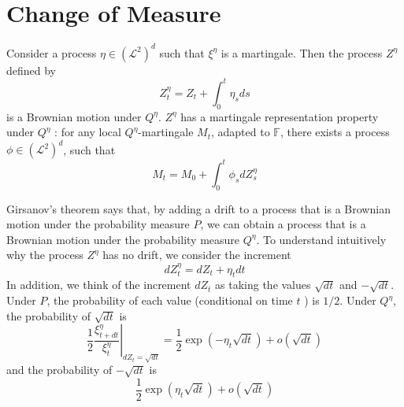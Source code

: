 \documentclass[\topdir/lecture\_notes.tex]{subfiles}
\begin{document}

\section{Change of Measure}
\begin{theorem}\label{thm: thm_273} 
Consider a process \(\eta \in\left(\mathcal{L}^{2}\right)^{d}\) such that \(\xi^{\eta}\) is a martingale. Then the process \(Z^{\eta}\) defined by
\begin{equation}
Z_{t}^{\eta}=Z_{t}+\int_{0}^{t} \eta_{s} d s \label{2.7.3}
\end{equation}
is a Brownian motion under \(Q^{\eta}\).
\(Z^{\eta}\) has a martingale representation property under \(Q^{\eta}\) : for any local \(Q^{\eta}\)-martingale \(M_{t}\), adapted to \(\mathbb{F}\), there exists a process \(\phi \in\left(\mathcal{L}^{2}\right)^{d}\), such that
\begin{equation*}
M_{t}=M_{0}+\int_{0}^{t} \phi_{s} d Z_{s}^{\eta}
\end{equation*}
\end{theorem}
Girsanov's theorem says that, by adding a drift to a process that is a Brownian motion under the probability measure \(P\), we can obtain a process that is a Brownian motion under the probability measure \(Q^{\eta}\). To understand intuitively why the process \(Z^{\eta}\) has no drift, we consider the increment
\begin{equation*}
d Z_{t}^{\eta}=d Z_{t}+\eta_{t} d t
\end{equation*}
In addition, we think of the increment \(d Z_{t}\) as taking the values \(\sqrt{d t}\) and \(-\sqrt{d t}\). Under \(P\), the probability of each value (conditional on time \(t\) ) is \(1 / 2\). Under \(Q^{\eta}\), the probability of \(\sqrt{d t}\) is
\begin{equation*}
\left.\frac{1}{2} \frac{\xi_{t+d t}^{\eta}}{\xi_{t}^{\eta}}\right|_{d Z_{t}=\sqrt{d t}}=\frac{1}{2} \exp \left(-\eta_{t} \sqrt{d t}\right)+o(\sqrt{d t})
\end{equation*}
and the probability of \(-\sqrt{d t}\) is
\begin{equation*}
\frac{1}{2} \exp \left(\eta_{t} \sqrt{d t}\right)+o(\sqrt{d t})
\end{equation*}
\end{document}
